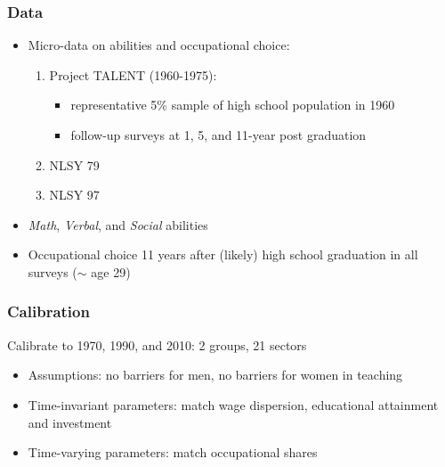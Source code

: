 \documentclass[11pt]{beamer}
\begin{document}
\begin{frame}
\frametitle{Data}
\begin{itemize}
	\item Micro-data on abilities and occupational choice:
	\begin{enumerate}
		\item Project TALENT (1960-1975):
		\begin{itemize}
			\item representative 5\% sample of high school population in 1960
			\item follow-up surveys at 1, 5, and 11-year post graduation
		\end{itemize}
		\item NLSY 79
		\item NLSY 97
	\end{enumerate}
	\item \textit{Math}, \textit{Verbal}, and \textit{Social} abilities
	\item Occupational choice 11 years after (likely) high school graduation in all surveys ($\sim$ age 29)
\end{itemize}
\end{frame}

\begin{frame}
\frametitle{Calibration}
\label{calib}
Calibrate to 1970, 1990, and 2010: 2 groups, 21 sectors
\begin{itemize}
\item Assumptions: no barriers for men, no barriers for women in teaching \hyperlink{assump}{}
\item Time-invariant parameters: match wage dispersion, educational attainment and investment \hyperlink{invar}{}
\item Time-varying parameters: match occupational shares \hyperlink{var}{}
\end{itemize}
\end{frame}
\end{document}
